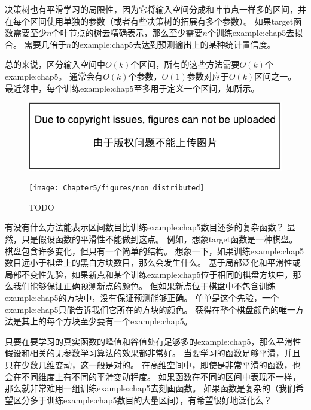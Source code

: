 决策树也有平滑学习的局限性，因为它将输入空间分成和叶节点一样多的区间，并在每个区间使用单独的参数（或者有些决策树的拓展有多个参数）。
如果\gls{target}函数需要至少$n$个叶节点的树去精确表示，那么至少需要$n$个训练\gls{example:chap5}去拟合。
需要几倍于$n$的\gls{example:chap5}去达到预测输出上的某种统计置信度。


总的来说，区分输入空间中$O(k)$个区间，所有的这些方法需要$O(k)$个\gls{example:chap5}。
通常会有$O(k)$个参数，$O(1)$参数对应于$O(k)$区间之一。
最近邻中，每个训练\gls{example:chap5}至多用于定义一个区间，如所示。


\begin{figure}[!htb]
\ifOpenSource
\centerline{\includegraphics{figure.pdf}}
\else
\centerline{\texttt{[image: Chapter5/figures/non\_distributed]}}
\fi
\caption{TODO}
\label{fig:chap5_non_distributed}
\end{figure}


有没有什么方法能表示区间数目比训练\gls{example:chap5}数目还多的复杂函数？
显然，只是假设函数的平滑性不能做到这点。
例如，想象\gls{target}函数是一种棋盘。
棋盘包含许多变化，但只有一个简单的结构。
想象一下，如果训练\gls{example:chap5}数目远小于棋盘上的黑白方块数目，那么会发生什么。
基于局部泛化和平滑性或局部不变性先验，如果新点和某个训练\gls{example:chap5}位于相同的棋盘方块中，那么我们能够保证正确预测新点的颜色。
但如果新点位于棋盘中不包含训练\gls{example:chap5}的方块中，没有保证预测能够正确。
单单是这个先验，一个\gls{example:chap5}只能告诉我们它所在的方块的颜色。
获得在整个棋盘颜色的唯一方法是其上的每个方块至少要有一个\gls{example:chap5}。


只要在要学习的真实函数的峰值和谷值处有足够多的\gls{example:chap5}，那么平滑性假设和相关的无参数学习算法的效果都非常好。
当要学习的函数足够平滑，并且只在少数几维变动，这一般是对的。
在高维空间中，即使是非常平滑的函数，也会在不同维度上有不同的平滑变动程度。
如果函数在不同的区间中表现不一样，那么就非常难用一组训练\gls{example:chap5}去刻画函数。
如果函数是复杂的（我们希望区分多于训练\gls{example:chap5}数目的大量区间），有希望很好地泛化么？

